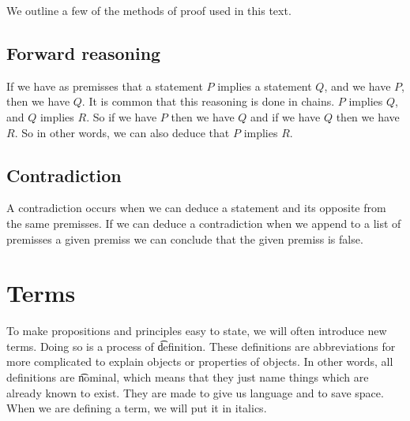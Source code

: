 We outline a few of the methods of proof used in this text.

\subsection*{Forward reasoning}

If we have as premisses that a statement $P$ implies a statement $Q$, and we have $P$, then we have $Q$.
It is common that this reasoning is done in chains.
$P$ implies $Q$, and $Q$ implies $R$. So if we have $P$ then we have $Q$ and if we have $Q$ then we have $R$.
So in other words, we can also deduce that $P$ implies $R$.

\subsection*{Contradiction}

A contradiction occurs when we can deduce a statement and its opposite from the same premisses.
If we can deduce a contradiction when we append to a list of premisses a given premiss we can conclude that the given premiss is false.

\section*{Terms}

To make propositions and principles easy to state, we will often introduce new terms.
Doing so is a process of \t{definition}.
These definitions are abbreviations for more complicated to explain objects or properties of objects.
In other words, all definitions are \t{nominal}, which means that they just name things which are already known to exist.
They are made to give us language and to save space.
When we are defining a term, we will put it in italics.


\blankpage
